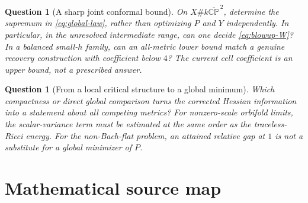 \documentclass[11pt]{article}
\newcommand{\CP}{\mathbb{CP}}
\newtheorem{question}[theorem]{Question}
\theoremstyle{definition}
\theoremstyle{remark}
\begin{document}
\begin{question}[A sharp joint conformal bound]
On $X\#k\overline{\CP}^{\,2}$, determine the supremum in
\eqref{eq:global-law}, rather than optimizing $P$ and $Y$ independently.
In particular, in the unresolved intermediate range, can one decide
\eqref{eq:blowup-W}? In a balanced small-$h$ family, can an all-metric
lower bound match a genuine recovery construction with coefficient below
$4$? The current cell coefficient is an upper bound, not a prescribed
answer.
\end{question}

\begin{question}[From a local critical structure to a global minimum]
Which compactness or direct global comparison turns the corrected
Hessian information into a statement about all competing metrics?
For nonzero-scale orbifold limits, the scalar-variance term must be
estimated at the same order as the traceless-Ricci energy. For the
non-Bach-flat problem, an attained relative gap at $1$ is not a substitute
for a global minimizer of $P$.
\end{question}

\appendix
\section{Mathematical source map}
\label{app:sources}
\end{document}

